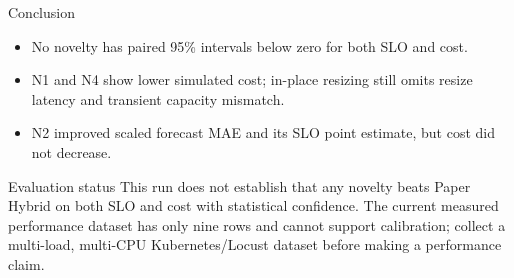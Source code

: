 \documentclass[aspectratio=169,10pt]{beamer}
\begin{document}
\begin{frame}{Conclusion}
\begin{itemize}
  \item No novelty has paired 95\% intervals below zero for both SLO and cost.
  \item N1 and N4 show lower simulated cost; in-place resizing still omits resize latency and transient capacity mismatch.
  \item N2 improved scaled forecast MAE and its SLO point estimate, but cost did not decrease.
\end{itemize}

\vspace{0.25cm}
\begin{alertblock}{Evaluation status}
This run does not establish that any novelty beats Paper Hybrid on both SLO and cost with statistical confidence. The current measured performance dataset has only nine rows and cannot support calibration; collect a multi-load, multi-CPU Kubernetes/Locust dataset before making a performance claim.
\end{alertblock}
\end{frame}
\end{document}
